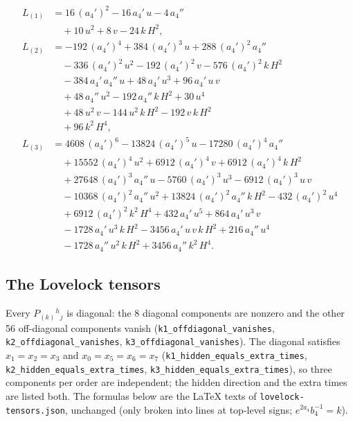 \documentclass[11pt]{article}
\begin{document}
\[
\begin{aligned}
L_{(1)} &= 16\,(a_4')^{2} - 16\,a_4'\,u - 4\,a_4'' \\
&\quad + 10\,u^{2} + 8\,v - 24\,k\,H^{2} , \\
L_{(2)} &= -192\,(a_4')^{4} + 384\,(a_4')^{3}\,u + 288\,(a_4')^{2}\,a_4'' \\
&\quad - 336\,(a_4')^{2}\,u^{2} - 192\,(a_4')^{2}\,v - 576\,(a_4')^{2}\,k\,H^{2} \\
&\quad - 384\,a_4'\,a_4''\,u + 48\,a_4'\,u^{3} + 96\,a_4'\,u\,v \\
&\quad + 48\,a_4''\,u^{2} - 192\,a_4''\,k\,H^{2} + 30\,u^{4} \\
&\quad + 48\,u^{2}\,v - 144\,u^{2}\,k\,H^{2} - 192\,v\,k\,H^{2} \\
&\quad + 96\,k^{2}\,H^{4} , \\
L_{(3)} &= 4608\,(a_4')^{6} - 13824\,(a_4')^{5}\,u - 17280\,(a_4')^{4}\,a_4'' \\
&\quad + 15552\,(a_4')^{4}\,u^{2} + 6912\,(a_4')^{4}\,v + 6912\,(a_4')^{4}\,k\,H^{2} \\
&\quad + 27648\,(a_4')^{3}\,a_4''\,u - 5760\,(a_4')^{3}\,u^{3} - 6912\,(a_4')^{3}\,u\,v \\
&\quad - 10368\,(a_4')^{2}\,a_4''\,u^{2} + 13824\,(a_4')^{2}\,a_4''\,k\,H^{2} - 432\,(a_4')^{2}\,u^{4} \\
&\quad + 6912\,(a_4')^{2}\,k^{2}\,H^{4} + 432\,a_4'\,u^{5} + 864\,a_4'\,u^{3}\,v \\
&\quad - 1728\,a_4'\,u^{3}\,k\,H^{2} - 3456\,a_4'\,u\,v\,k\,H^{2} + 216\,a_4''\,u^{4} \\
&\quad - 1728\,a_4''\,u^{2}\,k\,H^{2} + 3456\,a_4''\,k^{2}\,H^{4} .
\end{aligned}
\]

\subsection{The Lovelock tensors}

Every $P_{(k)}{}^h{}_j$ is diagonal: the 8 diagonal components are nonzero and the other 56 off-diagonal components vanish (\texttt{k1\_offdi\allowbreak{}agonal\_v\allowbreak{}anishes}, \texttt{k2\_offdi\allowbreak{}agonal\_v\allowbreak{}anishes}, \texttt{k3\_offdi\allowbreak{}agonal\_v\allowbreak{}anishes}). The diagonal satisfies $x_1 = x_2 = x_3$ and $x_0 = x_5 = x_6 = x_7$ (\texttt{k1\_hidde\allowbreak{}n\_equals\allowbreak{}\_extra\_t\allowbreak{}imes}, \texttt{k2\_hidde\allowbreak{}n\_equals\allowbreak{}\_extra\_t\allowbreak{}imes}, \texttt{k3\_hidde\allowbreak{}n\_equals\allowbreak{}\_extra\_t\allowbreak{}imes}), so three components per order are independent; the hidden direction and the extra times are listed both. The formulas below are the LaTeX texts of \texttt{lovelock\allowbreak{}-tensors\allowbreak{}.json}, unchanged (only broken into lines at top-level signs; $e^{2a_4}b_4^{-1} = k$).
\end{document}
